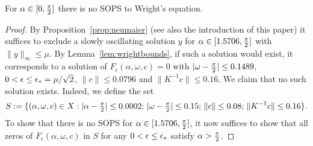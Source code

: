 \begin{theorem}
	\label{thm:WrightConjecture}
	For $ \alpha \in [0,\tfrac{\pi}{2}]$ there is no SOPS to Wright's equation.
\end{theorem}
\begin{proof}
By Proposition~\ref{prop:neumaier} (see also the introduction of this paper) it suffices to exclude a slowly oscillating solution $y$ for $\alpha \in [1.5706,\tfrac{\pi}{2}]$ with $\| y \|_\infty \leq \mu$.
By Lemma~\ref{lem:wrightbounds}, if such a solution would exist, it corresponds to a solution of 
$F_\epsilon(\alpha,\omega,c)=0$ with $|\omega- \tfrac{\pi}{2}| \leq 0.1489$, 
$0< \epsilon \leq \epsilon_* = \mu / \sqrt{2}$, 
$\| c \| \leq 0.0796 $ 
and 
$\| K^{-1} c \| \leq  0.16 $.
We claim that no such solution exists.
Indeed, we define the set 
\[
S :=  \{ (\alpha,\omega,c) \in X : 
|\alpha - \tfrac{\pi}{2}| \leq 0.0002; \,
|\omega - \tfrac{\pi}{2}| \leq 0.15; \, 
\| c \| \leq 0.08; \, 
\|K^{-1} c \| \leq 0.16  \}.
\]
To show that there is no SOPS for $\alpha \in [1.5706,\tfrac{\pi}{2}]$, it now suffices to show that all zeros of $F_\epsilon(\alpha,\omega,c)$ in $S$ for any $0< \epsilon \leq \epsilon_*$ satisfy $\alpha> \tfrac{\pi}{2}$.


\end{proof}
